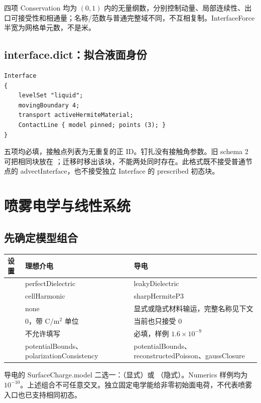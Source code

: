 \documentclass[a4paper,11pt]{article}
\begin{document}
四项 Conservation 均为 $(0,1)$ 内的无量纲数，分别控制动量、局部连续性、出口可接受性和相通量；名称/范数与普通完整域不同，不互相复制。InterfaceForce 半宽为网格单元数，不是米。

\subsection{interface.dict：拟合液面身份}
\begin{lstlisting}
Interface
{
    levelSet "liquid";
    movingBoundary 4;
    transport activeHermiteMaterial;
    ContactLine { model pinned; points (3); }
}
\end{lstlisting}
五项均必填，接触点列表为无重复的正 ID。钉扎没有接触角参数。旧 schema 2 可把相同块放在 ；迁移时移出该块，不能两处同时存在。此格式既不接受普通节点的 advectInterface，也不接受独立 Interface 的 prescribed 初态块。

\section{喷雾电学与线性系统}
\subsection{先确定模型组合}
\begin{longtable}{L{.30\linewidth}L{.29\linewidth}L{.33\linewidth}}
\toprule 设置 & 理想介电 & 导电 \\\midrule\endhead
{} & perfectDielectric & leakyDielectric \\
 & cellHarmonic & sharpHermiteP3 \\
 & none & 显式或隐式材料输运，完整名称见下文 \\
 & $0$，带 C/m$^2$ 单位 & 当前也只接受 $0$ \\
 & 不允许填写 & 必填，样例 $1.6\times10^{-9}$ \\
 & potentialBounds、polarizationConsistency & potentialBounds、reconstructedPoisson、gaussClosure \\
\bottomrule
\end{longtable}
导电的 SurfaceCharge.model 二选一：（显式）或 （隐式）。Numerics 样例均为 $10^{-10}$。上述组合不可任意交叉。独立固定电学能给非零初始面电荷，不代表喷雾入口也已支持相同初态。
\end{document}
